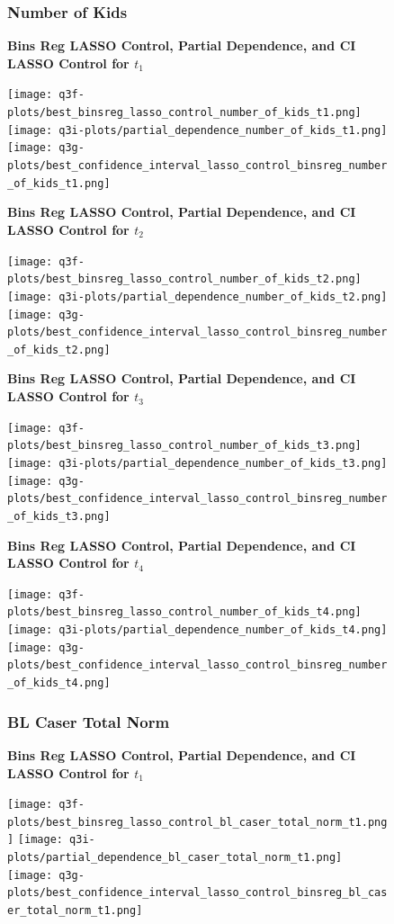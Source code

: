 \documentclass{article}
\begin{document}
{\begin{figure}[H]
  \subsubsection*{Number of Kids}
  \centering
  \textbf{Bins Reg LASSO Control, Partial Dependence, and CI LASSO Control for $t_1$}

  \texttt{[image: q3f-plots/best\_binsreg\_lasso\_control\_number\_of\_kids\_t1.png]}
  \texttt{[image: q3i-plots/partial\_dependence\_number\_of\_kids\_t1.png]}
  \texttt{[image: q3g-plots/best\_confidence\_interval\_lasso\_control\_binsreg\_number\_of\_kids\_t1.png]}

  \textbf{Bins Reg LASSO Control, Partial Dependence, and CI LASSO Control for $t_2$}

  \texttt{[image: q3f-plots/best\_binsreg\_lasso\_control\_number\_of\_kids\_t2.png]}
  \texttt{[image: q3i-plots/partial\_dependence\_number\_of\_kids\_t2.png]}
  \texttt{[image: q3g-plots/best\_confidence\_interval\_lasso\_control\_binsreg\_number\_of\_kids\_t2.png]}

  \textbf{Bins Reg LASSO Control, Partial Dependence, and CI LASSO Control for $t_3$}

  \texttt{[image: q3f-plots/best\_binsreg\_lasso\_control\_number\_of\_kids\_t3.png]}
  \texttt{[image: q3i-plots/partial\_dependence\_number\_of\_kids\_t3.png]}
  \texttt{[image: q3g-plots/best\_confidence\_interval\_lasso\_control\_binsreg\_number\_of\_kids\_t3.png]}

  \textbf{Bins Reg LASSO Control, Partial Dependence, and CI LASSO Control for $t_4$}

  \texttt{[image: q3f-plots/best\_binsreg\_lasso\_control\_number\_of\_kids\_t4.png]}
  \texttt{[image: q3i-plots/partial\_dependence\_number\_of\_kids\_t4.png]}
  \texttt{[image: q3g-plots/best\_confidence\_interval\_lasso\_control\_binsreg\_number\_of\_kids\_t4.png]}

\end{figure}
\begin{figure}[H]
  \subsubsection*{BL Caser Total Norm}
  \centering
  \textbf{Bins Reg LASSO Control, Partial Dependence, and CI LASSO Control for $t_1$}

  \texttt{[image: q3f-plots/best\_binsreg\_lasso\_control\_bl\_caser\_total\_norm\_t1.png]}
  \texttt{[image: q3i-plots/partial\_dependence\_bl\_caser\_total\_norm\_t1.png]}
  \texttt{[image: q3g-plots/best\_confidence\_interval\_lasso\_control\_binsreg\_bl\_caser\_total\_norm\_t1.png]}


\end{figure}}
\end{document}
